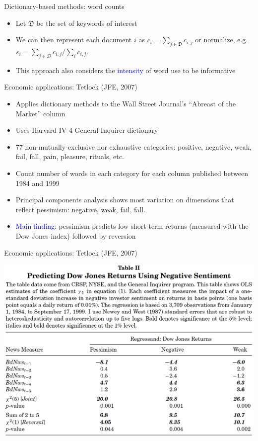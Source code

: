 \documentclass[english]{beamer}
\begin{document}
\begin{frame}{Dictionary-based methods: word counts}
\begin{itemize}
\setlength{\itemsep}{1.3em}
\item Let $\mathfrak{D}$ be the set of keywords of interest
\item We can then represent each document $i$ as $c_{i} =\sum_ {j\in\mathfrak{D}} c_{i,j}$ or normalize, e.g. $s_ {i} = \sum_{j\in\mathcal{D}}c_{i,j} / \sum_ {i}c _{i,j}$. \\
\item This approach also considers the \textcolor{blue}{intensity} of word use to be informative
\end{itemize}
\end{frame}
%
\begin{frame}{Economic applications: Tetlock (JFE, 2007)}
\begin{itemize}
\setlength{\itemsep}{0.8em}
\item Applies dictionary methods to the Wall Street Journal's ``Abreast of the Market'' column
\item Uses Harvard IV-4 General Inquirer dictionary
\item 77 non-mutually-exclusive nor exhaustive categories: positive, negative, weak, fail, fall, pain, pleasure, rituals, etc.
\item Count number of words in each category for each column published between 1984 and 1999
\item Principal components analysis shows most variation on dimensions that reflect pessimism: negative, weak, fail, fall.
\item \textcolor{blue}{Main finding}: pessimism predicts low short-term returns (measured with the Dow Jones index) followed by reversion
\end{itemize}
\end{frame}

\begin{frame}{Economic applications: Tetlock (JFE, 2007)}
\begin{center}
\includegraphics[scale=0.37]{Images/tetlock_fig2.png}
\end{center}
\end{frame}
\end{document}
